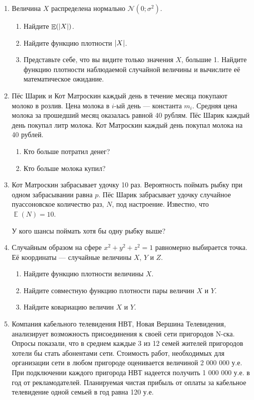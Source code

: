\documentclass[12pt]{article} %
\DeclareMathOperator{\E}{\mathbb{E}}
\newcommand \cN{\mathcal{N}}
\begin{document}
\begin{enumerate}
    \item Величина $X$ распределена нормально $\cN(0;\sigma^2)$.
    \begin{enumerate}
        \item Найдите $\E(\abs{X})$.
        \item Найдите функцию плотности $\abs{X}$.
        \item Представьте себе, что вы видите только значения $X$, большие 1. 
        Найдите функцию плотности наблюдаемой случайной величины и вычислите её математическое ожидание. 
    \end{enumerate}


    \item Пёс Шарик и Кот Матроскин каждый день в течение месяца покупают молоко в розлив. 
    Цена молока в $i$-ый день — константа $m_i$. 
    Средняя цена молока за прошедший месяц оказалась равной 40 рублям. 
    Пёс Шарик каждый день покупал литр молока. Кот Матроскин каждый день покупал молока на 40 рублей. 
    
    \begin{enumerate}
        \item Кто больше потратил денег? 
        \item Кто больше молока купил?
    \end{enumerate}
    
    \item Кот Матроскин забрасывает удочку 10 раз.
  Вероятность поймать рыбку при одном забрасывании равна $p$.
  Пёс Шарик забрасывает удочку случайное пуассоновское количество раз,
  $N$, под настроение. Известно, что $\E(N) = 10$.
  
  У кого шансы поймать хотя бы одну рыбку выше?
  
  \item Случайным образом на сфере $x^2+y^2+z^2=1$ равномерно выбирается точка. 
  Её координаты — случайные величины $X$, $Y$ и $Z$.
  
  \begin{enumerate}
      \item Найдите функцию плотности величины $X$.
      \item Найдите совместную функцию плотности пары величин $X$ и $Y$.
      \item Найдите ковариацию величин $X$ и $Y$.
  \end{enumerate}

  \item Компания кабельного телевидения НВТ, Новая Вершина Телевидения, анализирует возможность
  присоединения к своей сети пригородов N-ска. Опросы показали, что в среднем каждые 3 из 12
  семей жителей пригородов хотели бы стать абонентами сети. Стоимость работ, необходимых для
  организации сети в любом пригороде оценивается величиной 2 000 000 у.е. При подключении каждого
  пригорода НВТ надеется получить 1 000 000 у.е. в год от рекламодателей. Планируемая чистая прибыль
  от оплаты за кабельное телевидение одной семьей в год равна 120 у.е.
  

\end{enumerate}
\end{document}
